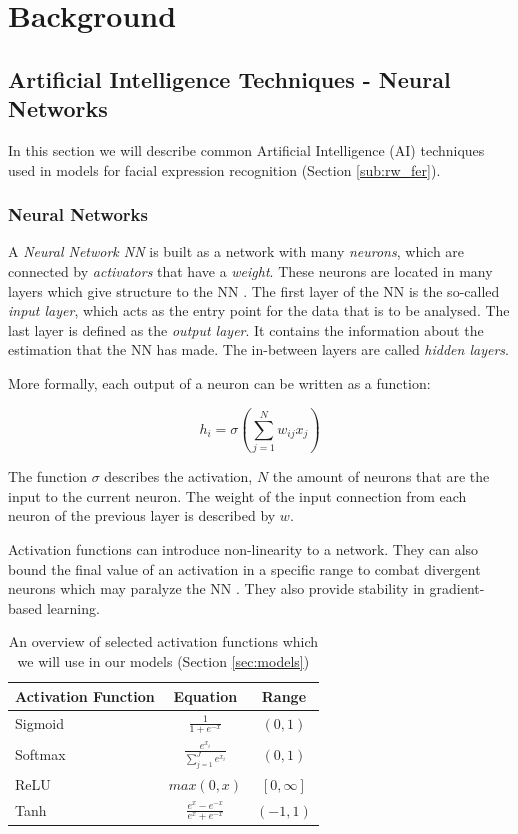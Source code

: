 \newpage
\section{Background}
\label{sec:related}

\subsection{Artificial Intelligence Techniques - Neural Networks}
\label{sub:aiml}
In this section we will describe common Artificial Intelligence (AI) techniques used in models for  facial expression recognition (Section \ref{sub:rw_fer}).
\subsubsection{Neural Networks}
A \emph{Neural Network NN} is built as a network with many \emph{neurons}, which are connected by \emph{activators} that have a \emph{weight}. These neurons are located in many layers which give structure to the NN \cite{schmidhuber2015deep}. The first layer of the NN is the so-called \emph{input layer}, which acts as the entry point for the data that is to be analysed. The last layer is defined as the \emph{output layer}. It contains the information about the estimation that the NN has made. The in-between layers are called \emph{hidden layers}.

More formally, each output of a neuron can be written as a function:

\begin{equation}
    h_i = \sigma (\sum_{j=1}^{N} w_{ij}x_{j})
\end{equation}

The function $\sigma$ describes the activation, $N$ the amount of neurons that are the input to the current neuron. The weight of the input connection from each neuron of the previous layer is described by $w$.

Activation functions can introduce non-linearity to a network. They can also bound the final value of an activation in a specific range to combat divergent neurons which may paralyze the NN \cite{wang2003artificial}. They also provide stability in gradient-based learning.
\bgroup
\def\arraystretch{2}
\begin{table}
    \centering
    \begin{tabular}{l|c|c}
        \textbf{Activation Function} & \textbf{Equation} & \textbf{Range} \\ \hline \hline
         Sigmoid & $\frac{1}{1 + e^{-x}}$ &  $(0,1)$\\\hline
         Softmax & $\frac{e^{x_i}}{\sum_{j=1}^{J} e^{x_i}}$ & $(0,1)$\\\hline
         ReLU & $max(0, x)$ & $[0, \infty]$ \\\hline
         Tanh & $\frac{e^x - e^{-x}}{e^x + e^{-x}}$ & $(-1, 1)$\\\hline
    \end{tabular}
    \caption{An overview of selected activation functions which we will use in our models (Section \ref{sec:models})}
    \label{tab:activation_funcs}
\end{table}
\egroup

